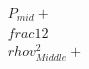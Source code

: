 \documentclass[preview]{standalone}
\begin{document}
\begin{align*}
P_{mid} + \\frac{1}{2} \\rho v_{Middle}^2 +
\end{align*}
\end{document}
